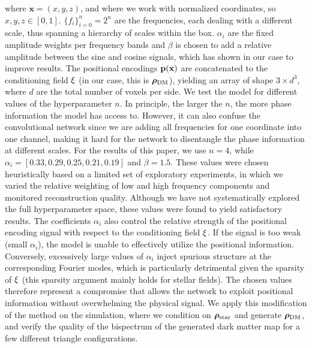 where $\mathbf{x}=(x,y,z)$, and where we work with normalized coordinates, so $x,y,z\in[0,1]$. $\{f_i\}^n_{i=0} = 2^n$ are the frequencies, each dealing with a different scale, thus spanning a hierarchy of scales within the box. $\alpha_i$ are the fixed amplitude weights per frequency bands and $\beta$ is chosen to add a relative amplitude between the sine and cosine signals, which has shown in our case to improve results. The positional encodings $\textbf{p}(\textbf{x})$ are concatenated to the conditioning field $\xi$ (in our case, this is $\boldsymbol{\rho}_\mathrm{DM}$), yielding an array of shape $3\times d^3$, where $d$ are the total number of voxels per side. We test the model for different values of the hyperparameter $n$. In principle, the larger the $n$, the more phase information the model has access to. However, it can also confuse the convolutional network since we are adding all frequencies for one coordinate into one channel, making it hard for the network to disentangle the phase information at different scales. For the results of this paper, we use $n=4$, while $\alpha_i=[0.33,0.29,0.25,0.21,0.19]$ and $\beta=1.5$. These values were chosen heuristically based on a limited set of exploratory experiments, in which we varied the relative weighting of low and high frequency components and monitored reconstruction quality. Although we have not systematically explored the full hyperparameter space, these values were found to yield satisfactory results. The coefficients $\alpha_i$ also control the relative strength of the positional encoding signal with respect to the conditioning field $\xi$. If the signal is too weak (small $\alpha_i$), the model is unable to effectively utilize the positional information. Conversely, excessively large values of $\alpha_i$ inject spurious structure
at the corresponding Fourier modes, which is particularly detrimental given the sparsity of $\xi$ (this sparsity argument mainly holds for stellar fields).
The chosen values therefore represent a compromise that allows the network to exploit positional information without overwhelming the physical signal.
We apply this modification of the method on the \TNG simulation, where we condition on $\bm{\rho}_\text{star}$ and generate $\boldsymbol{\rho}_\mathrm{DM}$, and verify the quality of the bispectrum of the generated dark matter map for a few different triangle configurations.


